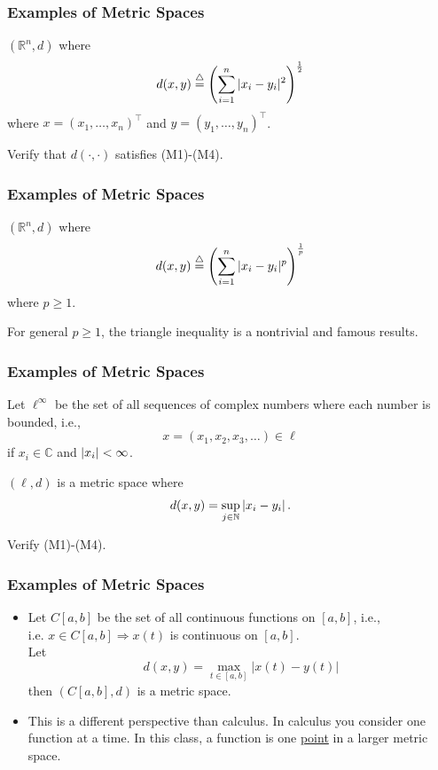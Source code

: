 \documentclass{beamer}
\begin{document}
\begin{frame}\frametitle{Examples of Metric Spaces}

\begin{example}[E2]

$(\mathbb{R}^n, d)$ where 
\[
d(x,y) \stackrel{\triangle}{=} \left( \sum_{i=1}^{n} |x_i - y_i|^2 \right)^{\frac{1}{2}}
\]
where $x=(x_1, \dots, x_n)^\top$ and $y=(y_1, \dots, y_n)^\top$.

Verify that $d(\cdot, \cdot)$ satisfies (M1)-(M4).
\end{example}
\end{frame}

\begin{frame}\frametitle{Examples of Metric Spaces}

\begin{example}[E3]

$(\mathbb{R}^n, d)$ where 
\[
d(x,y) \stackrel{\triangle}{=} \left( \sum_{i=1}^{n} |x_i - y_i|^p \right)^{\frac{1}{p}}
\]
where $p\geq 1$.

For general $p\geq 1$, the triangle inequality is a nontrivial and famous results.
\end{example}

\end{frame}

\begin{frame}\frametitle{Examples of Metric Spaces}

\begin{example}

Let $\boldsymbol{\ell}^\infty$ be the set of all sequences of complex numbers where each number is bounded, i.e., 
\[
x = (x_1, x_2, x_3, \dots) \in \boldsymbol{\ell}
\]
if $x_i\in\mathbb{C}$ and $\left|x_i\right|<\infty$.

$(\boldsymbol{\ell}, d)$ is a metric space where
\[
d(x, y) = \sup_{j\in\mathbb{N}} \left|x_i - y_i\right|.
\]
\end{example}

Verify (M1)-(M4).
\end{frame}

\begin{frame}\frametitle{Examples of Metric Spaces}

\begin{example}
\begin{itemize}
\item Let $C[a,b]$ be the set of all continuous functions on $[a,b]$, i.e., \\
\indent \indent i.e. $ x \in C[a,b] \Rightarrow x(t) $ is continuous on $[a,b]$.\\
Let 
\[ 
d(x,y) = \max_{t \in [a,b]} |x(t)-y(t)| 
\]
then $(C[a, b], d)$ is a metric space.

\item This is a different perspective than calculus.  In calculus you consider one function at a time.  In this class, a function is one \underline{point} in a larger metric space.
\end{itemize}
\end{example}
\end{frame}
\end{document}
